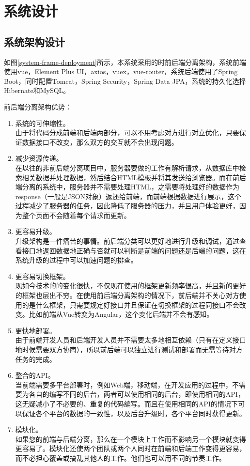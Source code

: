 
\chapter{系统设计}

\label{chap07}


\section{系统架构设计}

如图\ref{system-frame-deployment}所示，本系统采用的时前后端分离架构，系统前端使用vue，Element Plus UI，axios，vuex，vue-router，系统后端使用了Spring Boot，同时配置Tomcat，Spring Security，Spring Data JPA，系统的持久化选择Hibernate和MySQL。

前后端分离架构优势：
\begin{enumerate}
    \item 系统的可伸缩性。\\由于将代码分成前端和后端两部分，可以不用考虑对方进行对立优化，只要保证数据接口不改变，那么双方的交互就不会出现问题。
    \item 减少资源传递。\\在以往的非前后端分离项目中，服务器要做的工作有解析请求，从数据库中检索相关数据并处理数据，然后结合HTML模板并将其发送给浏览器。而在前后端分离的系统中，服务器并不需要处理HTML，之需要将处理好的数据作为response（一般是JSON对象）返还给前端，而前端根据数据进行展示，这个过程减少了服务器的任务，因此降低了服务器的压力，并且用户体验更好，因为整个页面不会随着每个请求而更新。
    \item 更容易升级。\\升级架构是一件痛苦的事情。前后端分类可以更好地进行升级和调试，通过查看接口地返回数据地正确与否就可以判断是前端的问题还是后端的问题，这在系统升级的过程中可以加速问题的排查。
    \item 更容易切换框架。\\现如今技术的的变化很快，不仅现在使用的框架更新频率很高，并且新的更好的框架也层出不穷。在使用前后端分离架构的情况下，前后端并不关心对方使用的是什么框架，只需要规定好接口并且保证在切换框架的过程同接口不会改变。比如前端从Vue转变为Angular，这个变化后端并不会有感知。
    \item 更快地部署。\\由于前端开发人员和后端开发人员并不需要太多地相互依赖（只有在定义接口地时候需要双方协商），所以前后端可以独立进行测试和部署而无需等待对方任务的完成。
    \item 整合的API。\\当前端需要多平台部署时，例如Web端，移动端，在开发应用的过程中，不需要为各自的编写不同的后台，两者可以使用相同的后台，即使用相同的API，这无疑减小了不必要的、重复的代码编写。而且在使用相同的API的情况下可以保证各个平台的数据的一致性，以及后台升级时，各个平台同时获得更新。
    \item 模块化。\\如果您的前端与后端分离，那么在一个模块上工作而不影响另一个模块就变得更容易了。模块化还使两个团队或两个人同时在前端和后端工作变得更容易，而不必担心覆盖或搞乱其他人的工作。他们也可以用不同的节奏工作。
\end{enumerate}

